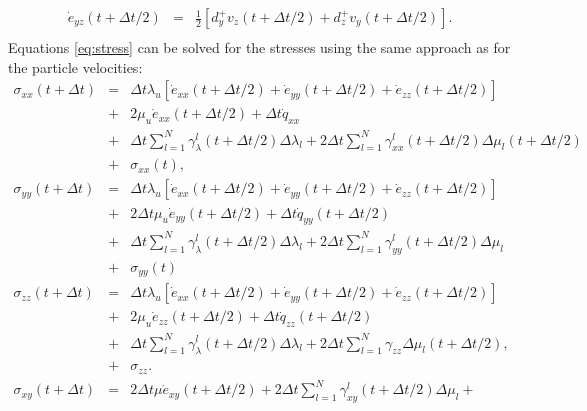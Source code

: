 \documentclass[11pt]{article}
\begin{document}
{\begin{eqnarray}
    \dot{e}_{yz}(t+\Delta t/2) & = & \frac{1}{2}\left[d^+_y v_z(t+\Delta t/2) +d^+_z v_y(t+\Delta t/2)\right]. \nonumber\\
\end{eqnarray}
%
Equations \eqref{eq:stress}   can be solved for the stresses using the same approach as for the particle velocities:
\begin{eqnarray}
  \sigma_{xx}(t+\Delta t) & = & \Delta t\lambda_u \left [\dot{e}_{xx}(t+\Delta t/2) + \dot{e}_{yy}(t+\Delta t/2) + 
                                \dot{e}_{zz}(t+\Delta t/2)\right]\nonumber\\
                           & + & 2\mu_u \dot{e}_{xx}(t+\Delta t/2) +\Delta t\dot{q}_{xx} \nonumber\\
                           & + & \Delta t\sum_{l=1}^N\gamma^l_{\lambda}(t+\Delta t/2)\Delta\lambda_l  
                             +   2\Delta t\sum_{l=1}^N\gamma^l_{xx}(t+\Delta t/2)\Delta\mu_l(t+\Delta t/2)\nonumber\\ 
                           & + &\sigma_{xx}(t),\\
  \sigma_{yy}(t+\Delta t) & = & \Delta t\lambda_u \left [\dot{e}_{xx}(t+\Delta t/2) + \dot{e}_{yy}(t+\Delta t/2) + 
                                \dot{e}_{zz}(t+\Delta t/2)\right]\\
                          & + & 2\Delta t \mu_u \dot{e}_{yy}(t+\Delta t/2) +\Delta t \dot{q}_{yy}(t+\Delta t/2) \nonumber\\
                          & + & \Delta t\sum_{l=1}^N\gamma^l_{\lambda}(t+\Delta t/2)\Delta\lambda_l  
                            +   2\Delta t\sum_{l=1}^N\gamma^l_{yy}(t+\Delta t/2)\Delta\mu_l\\
                          & +& \sigma_{yy}(t) \\
  \sigma_{zz}(t+\Delta t) & = & \Delta t\lambda_u \left [\dot{e}_{xx}(t+\Delta t/2) + \dot{e}_{yy}(t+\Delta t/2) 
                               + \dot{e}_{zz}(t+\Delta t/2)\right] \\
                          & + & 2\mu_u \dot{e}_{zz}(t+\Delta t/2) +\Delta t \dot{q}_{zz}(t+\Delta t/2) \nonumber\\
                          & + & \Delta t\sum_{l=1}^N\gamma^l_{\lambda}(t+\Delta t/2)\Delta\lambda_l   
                            +   2\Delta t\sum_{l=1}^N\gamma_{zz}\Delta\mu_l (t+\Delta t/2)\nonumber, \\
                          & + & \sigma_{zz}.\\
  \sigma_{xy}(t+\Delta t) & = & 2\Delta t\mu \dot{e}_{xy}(t+\Delta t/2) + 2\Delta t\sum_{l=1}^N\gamma^l_{xy}(t+\Delta t/2)\Delta\mu_l+

\end{eqnarray}}
\end{document}
